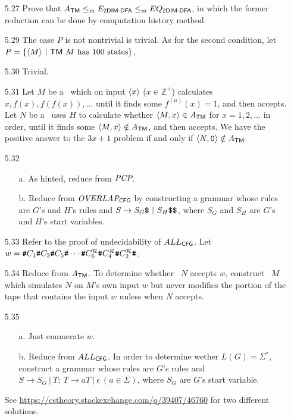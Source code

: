 \begin{itemize}
	\item[5.27]
	Prove that $A_{\TM} \Leqm E_{\textsf{2DIM-DFA}} \Leqm EQ_{\textsf{2DIM-DFA}}$, in which the former reduction can be done by computation history method.
	
	\item[\Star 5.28]
	\Omit
	
	\item[5.29]
	The case $P$ is not nontrivial is trivial. As for the second condition, let $P = \{ \Bra{M} \ | \ \TM\ M \text{ has $100$ states} \}$.
	
	\item[5.30]
	Trivial.
	
	\item[5.31]
	Let $M$ be a \TM\ which on input $\Bra{x}$ ($x \in \mathbb{Z}^+$) calculates $x, f(x), f(f(x)), \dots$ until it finds some $f^{(n)}(x)	= 1$, and then accepts. Let $N$ be a \TM\ uses $H$ to calculate whether $\Bra{M, x} \in A_{\TM}$ for $x = 1, 2, \dots$ in order, until it finds some $\Bra{M, x} \notin A_{\TM}$, and then accepts. We have the positive answer to the $3x + 1$ problem if and only if $\Bra{N, \TT{0}} \notin A_{\TM}$. 
	
	\item[5.32]
	\begin{itemize}
		\item[a.] As hinted, reduce from $\IT{PCP}$.
		\item[b.] Reduce from $\IT{OVERLAP}_{\CFG}$ by constructing a grammar whose rules are $G$'s and $H$'s rules and $S \to S_G \TT{\$} \ | \ S_H \TT{\$\$}$, where $S_G$ and $S_H$ are $G$'s and $H$'s start variables.
	\end{itemize}

	\item[5.33]
	Refer to the proof of undecidability of $ALL_{\CFG}$. Let $w = \TT{\#} C_1 \TT{\#} C_3 \TT{\#} C_5 \TT{\#} \cdots \TT{\#} C_6^\mathcal{R} \TT{\#} C_4^\mathcal{R} \TT{\#} C_2^\mathcal{R} \TT{\#}$.
	
	\item[5.34]
	Reduce from $A_{\TM}$. To determine whether \TM\ $N$ accepts $w$, construct \TM\ $M$ which simulates $N$ on $M$'s own input $w$ but never modifies the portion of the
	tape that contains the input $w$ unless when $N$ accepts.
	
	\item[5.35]
	\begin{itemize}
		\item[a.] Just enumerate $w$.
		\item[b.] Reduce from $ALL_{\CFG}$. In order to determine wether $L(G) = \Sigma^*$, construct a grammar whose rules are $G$'s rules and $S \to S_G \ | \ T;\ T \to aT \ | \ \epsilon \ (a \in \Sigma)$, where $S_G$ are $G$'s start variable.
	\end{itemize}
	
	\item[\Star 5.36]
	See \url{https://cstheory.stackexchange.com/q/39407/46760} for two different solutions.
	
\end{itemize}